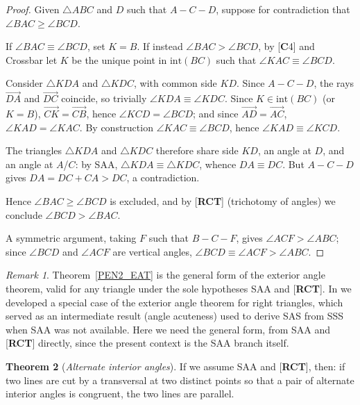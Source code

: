 \documentclass[11pt,a4paper]{article}
\theoremstyle{definition}
\newtheorem{thm}{Theorem}[section]
\theoremstyle{remark}
\newtheorem{rem}[thm]{Remark}
\numberwithin{equation}{section}
\begin{document}
\begin{proof}
Given $\triangle ABC$ and $D$ such that $A-C-D$, suppose for contradiction that
$\angle BAC\geq\angle BCD$.

If $\angle BAC\equiv\angle BCD$, set $K=B$. If instead $\angle BAC>\angle BCD$, by [\textbf{C}4]
and Crossbar let $K$ be the unique point in $\mathrm{int}(BC)$ such that
$\angle KAC\equiv\angle BCD$.

Consider $\triangle KDA$ and $\triangle KDC$, with common side $KD$. Since $A-C-D$, the rays
$\overrightarrow{DA}$ and $\overrightarrow{DC}$ coincide, so trivially
$\angle KDA\equiv\angle KDC$. Since $K\in\mathrm{int}(BC)$ (or $K=B$),
$\overrightarrow{CK}=\overrightarrow{CB}$, hence $\angle KCD=\angle BCD$; and since
$\overrightarrow{AD}=\overrightarrow{AC}$, $\angle KAD=\angle KAC$. By construction
$\angle KAC\equiv\angle BCD$, hence $\angle KAD\equiv\angle KCD$.

The triangles $\triangle KDA$ and $\triangle KDC$ therefore share side $KD$, an angle at $D$,
and an angle at $A$/$C$: by SAA, $\triangle KDA\equiv\triangle KDC$, whence $DA\equiv DC$. But
$A-C-D$ gives $DA=DC+CA>DC$, a contradiction.

Hence $\angle BAC\geq\angle BCD$ is excluded, and by [\textbf{RCT}] (trichotomy of angles) we
conclude $\angle BCD>\angle BAC$.

A symmetric argument, taking $F$ such that $B-C-F$, gives $\angle ACF>\angle ABC$; since
$\angle BCD$ and $\angle ACF$ are vertical angles, $\angle BCD\equiv\angle ACF>\angle ABC$.
\end{proof}

\begin{rem}
Theorem~\ref{PEN2_EAT} is the general form of the exterior angle theorem, valid for any
triangle under the sole hypotheses SAA and [\textbf{RCT}]. In \cite{Volpe2026I} we developed a
special case of the exterior angle theorem for right triangles, which served as an
intermediate result (angle acuteness) used to derive SAS from SSS when SAA was not
available. Here we need the general form, from SAA and [\textbf{RCT}] directly, since the
present context is the SAA branch itself.
\end{rem}

\begin{thm}[\emph{Alternate interior angles}]\label{PEN2_AI}
If we assume SAA and [\textbf{RCT}], then: if two lines are cut by a transversal at two distinct
points so that a pair of alternate interior angles is congruent, the two lines are parallel.
\end{thm}
\end{document}
